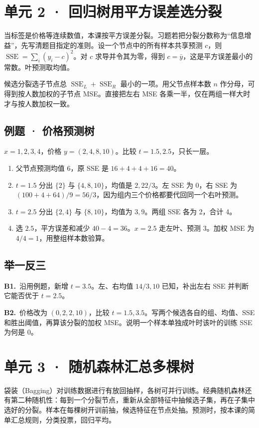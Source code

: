 \documentclass[UTF8,a4paper,11pt]{ctexart}
\newcommand{\CompactQuestion}[2]{\par\noindent\textbf{#1.}\ #2\par\vspace{.8em}}
\begin{document}
\section{单元 2 · 回归树用平方误差选分裂}
当标签是价格等连续数值，本课按平方误差分裂。习题若把分裂分数称为“信息增益”，先写清题目指定的准则。设一个节点中的所有样本共享预测 $c$，则 $\operatorname{SSE}=\sum_i(y_i-c)^2$。对 $c$ 求导并令其为零，得到 $c=\bar y$，这是平方误差最小的常数。叶预测取均值。

候选分裂选子节点总 $\operatorname{SSE}_L+\operatorname{SSE}_R$ 最小的一项。用父节点样本数 $n$ 作分母，可得到按人数加权的子节点 MSE。直接把左右 MSE 各乘一半，仅在两组一样大时才与按人数加权一致。

\subsection{例题 · 价格预测树}
$x=1,2,3,4$，价格 $y=(2,4,8,10)$。比较 $t=1.5,2.5$，只长一层。

\begin{enumerate}
\item 父节点预测均值 6，原 SSE 是 $16+4+4+16=40$。
\item $t=1.5$ 分出 $\{2\}$ 与 $\{4,8,10\}$，均值是 $2,22/3$。左 SSE 为 0，右 SSE 为 $(100+4+64)/9=56/3$，因为组内三个价格都要代回同一个右叶预测。
\item $t=2.5$ 分出 $\{2,4\}$ 与 $\{8,10\}$，均值为 $3,9$。两组 SSE 各为 2，合计 4。
\item 选 $2.5$，平方误差和减少 $40-4=36$。$x=2.5$ 走左叶、预测 3。加权 MSE 为 $4/4=1$，用整组样本数验算。
\end{enumerate}
\subsection{举一反三}
\CompactQuestion{B1}{沿用例题，新增 $t=3.5$。左、右均值 $14/3,10$ 已知，补出左右 SSE 并判断它能否优于 $t=2.5$。}
\CompactQuestion{B2}{价格改为 $(0,2,2,10)$，比较 $t=1.5,3.5$。写两个候选各自的组、均值、SSE 和胜出阈值，再算该分裂的加权 MSE。说明一个样本单独成叶时该叶的训练 SSE 为何是 0。}
\clearpage
\section{单元 3 · 随机森林汇总多棵树}
袋装（Bagging）对训练数据进行有放回抽样，各树可并行训练。经典随机森林还有第二种随机性：每到一个分裂节点，重新从全部特征中抽候选子集，再在子集中选好的分裂。样本在每棵树开训前抽，候选特征在节点处抽。预测时，按本课的简单汇总规则，分类投票，回归平均。
\end{document}
